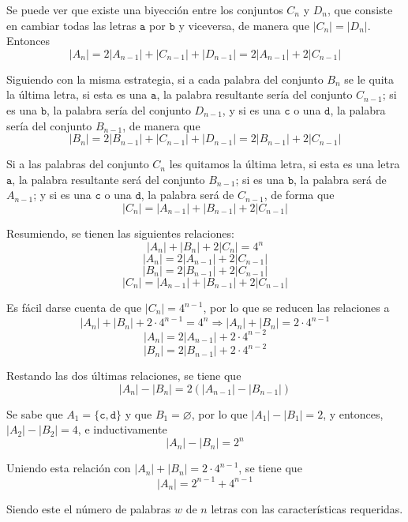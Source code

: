 \documentclass[../../main.tex]{subfiles}
\begin{document}
  Se puede ver que existe una biyección entre los conjuntos $C_n$ y $D_n$, que consiste en cambiar todas las letras $\mathtt{a}$ por $\mathtt{b}$ y viceversa, de manera que $|C_n| = |D_n|$. Entonces
  $$
  |A_n| = 2 |A_{n - 1}| + |C_{n - 1}| + |D_{n - 1}| = 2 |A_{n - 1}| + 2 |C_{n - 1}|
  $$

  Siguiendo con la misma estrategia, si a cada palabra del conjunto $B_n$ se le quita la última letra, si esta es una $\mathtt{a}$, la palabra resultante sería del conjunto $C_{n - 1}$; si es una $\mathtt{b}$, la palabra sería del conjunto $D_{n - 1}$, y si es una $\mathtt{c}$ o una $\mathtt{d}$, la palabra sería del conjunto $B_{n - 1}$, de manera que
  $$
  |B_n| = 2 |B_{n - 1}| + |C_{n - 1}| + |D_{n - 1}| = 2 |B_{n - 1}| + 2 |C_{n - 1}|
  $$

  Si a las palabras del conjunto $C_n$ les quitamos la última letra, si esta es una letra $\mathtt{a}$, la palabra resultante será del conjunto $B_{n - 1}$; si es una $\mathtt{b}$, la palabra será de $A_{n - 1}$; y si es una $\mathtt{c}$ o una $\mathtt{d}$, la palabra será de $C_{n - 1}$, de forma que
  $$
  |C_n| = |A_{n - 1}| + |B_{n - 1}| + 2 |C_{n - 1}|
  $$

  Resumiendo, se tienen las siguientes relaciones:
  $$
  |A_n| + |B_n| + 2 |C_n| = 4^n
  $$
  $$
  |A_n| = 2 |A_{n - 1}| + 2 |C_{n - 1}|
  $$
  $$
  |B_n| = 2 |B_{n - 1}| + 2 |C_{n - 1}|
  $$
  $$
  |C_n| = |A_{n - 1}| + |B_{n - 1}| + 2 |C_{n - 1}|
  $$

  Es fácil darse cuenta de que $|C_n| = 4^{n - 1}$, por lo que se reducen las relaciones a
  $$
  |A_n| + |B_n| + 2 \cdot 4^{n - 1} = 4^n \Longrightarrow |A_n| + |B_n| = 2 \cdot 4^{n - 1}
  $$
  $$
  |A_n| = 2 |A_{n - 1}| + 2 \cdot 4^{n - 2}
  $$
  $$
  |B_n| = 2 |B_{n - 1}| + 2 \cdot 4^{n - 2}
  $$

  Restando las dos últimas relaciones, se tiene que
  $$
  |A_n| - |B_n| = 2 \left(|A_{n - 1}| - |B_{n - 1}|\right)
  $$

  Se sabe que $A_{1} = \{\mathtt{c}, \mathtt{d}\}$ y que $B_1 = \varnothing$, por lo que $|A_1| - |B_1| = 2$, y entonces, $|A_2| - |B_2| = 4$, e inductivamente
  $$
  |A_n| - |B_n| = 2^n
  $$

  Uniendo esta relación con $|A_n| + |B_n| = 2 \cdot 4^{n - 1}$, se tiene que
  $$
  |A_n| = 2^{n - 1} + 4^{n - 1}
  $$

  Siendo este el número de palabras $w$ de $n$ letras con las características requeridas.
\end{document}
